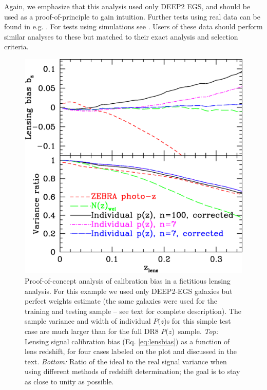 \documentclass[12pt,preprint]{aastex}
\newcommand{\pofz}{$P(z$)}
\begin{document}
Again, we emphasize that this analysis used only DEEP2 EGS, and should be used
as a proof-of-principle to gain intuition.  Further tests using real data can
be found in e.g. \cite{LimaPhotoz08,car11}.  For tests using simulations see
\cite{CunhaPhotoz09}.  Users of these data should perform similar analyses to
these but matched to their exact analysis and selection criteria.

\begin{figure} [h]\centering
    \includegraphics[scale=0.5]{figures/pz.egs.c3n7.paper.eps}

    \caption{ Proof-of-concept analysis of calibration bias in a fictitious
    lensing analysis.  For this example we used only DEEP2-EGS galaxies but
    perfect weights estimate (the same galaxies were used for the training and
    testing sample -- see text for complete description). The sample variance
    and width of individual \pofz s for this simple test case are much larger
    than for the full DR8 \pofz\ sample.  {\em Top:} Lensing signal calibration
    bias (Eq.  \ref{eq:lensbias}) as a function of lens redshift, for four
    cases labeled on the plot and discussed in the text.  {\em Bottom:} Ratio
    of the ideal to the real signal variance when using different methods of
    redshift determination; the goal is to stay as close to unity as possible.
    \label{fig:simplebias}}

\end{figure}
\end{document}
